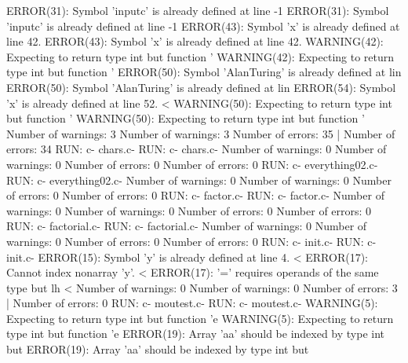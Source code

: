 \documentclass[12pt]{book}
\begin{document}
ERROR(31): Symbol 'inputc' is already defined at line -1        ERROR(31): Symbol 'inputc' is already defined at line -1
ERROR(43): Symbol 'x' is already defined at line 42.                ERROR(43): Symbol 'x' is already defined at line 42.
WARNING(42): Expecting to return type int but function '        WARNING(42): Expecting to return type int but function '
ERROR(50): Symbol 'AlanTuring' is already defined at lin        ERROR(50): Symbol 'AlanTuring' is already defined at lin
ERROR(54): Symbol 'x' is already defined at line 52.           <
WARNING(50): Expecting to return type int but function '        WARNING(50): Expecting to return type int but function '
Number of warnings: 3                                                Number of warnings: 3
Number of errors: 35                                           |        Number of errors: 34
RUN: c- chars.c-                                                RUN: c- chars.c-
Number of warnings: 0                                                Number of warnings: 0
Number of errors: 0                                                Number of errors: 0
RUN: c- everything02.c-                                                RUN: c- everything02.c-
Number of warnings: 0                                                Number of warnings: 0
Number of errors: 0                                                Number of errors: 0
RUN: c- factor.c-                                                RUN: c- factor.c-
Number of warnings: 0                                                Number of warnings: 0
Number of errors: 0                                                Number of errors: 0
RUN: c- factorial.c-                                                RUN: c- factorial.c-
Number of warnings: 0                                                Number of warnings: 0
Number of errors: 0                                                Number of errors: 0
RUN: c- init.c-                                                        RUN: c- init.c-
ERROR(15): Symbol 'y' is already defined at line 4.           <
ERROR(17): Cannot index nonarray 'y'.                           <
ERROR(17): '=' requires operands of the same type but lh   <
Number of warnings: 0                                                Number of warnings: 0
Number of errors: 3                                           |        Number of errors: 0
RUN: c- moutest.c-                                                RUN: c- moutest.c-
WARNING(5): Expecting to return type int but function 'e        WARNING(5): Expecting to return type int but function 'e
ERROR(19): Array 'aa' should be indexed by type int but         ERROR(19): Array 'aa' should be indexed by type int but 
\end{document}
